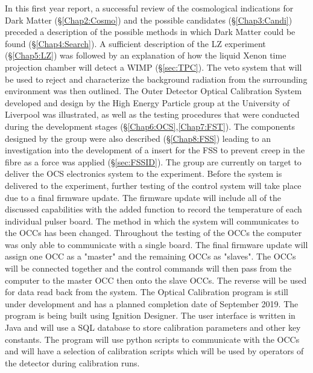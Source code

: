 In this first year report, a successful review of the cosmological indications for Dark Matter (\S\ref{Chap2:Cosmo}) and the possible candidates (\S\ref{Chap3:Candi}) preceded a description of the possible methods in which Dark Matter could be found (\S\ref{Chap4:Search}). A sufficient description of the LZ experiment (\S\ref{Chap5:LZ}) was followed by an explanation of how the liquid Xenon time projection chamber will detect a WIMP (\S\ref{sec:TPC}). The veto system that will be used to reject and characterize the background radiation from the surrounding environment was then outlined. 
\newline
The Outer Detector Optical Calibration System developed and design by the High Energy Particle group at the University of Liverpool was illustrated, as well as the testing procedures that were conducted during the development stages (\S\ref{Chap6:OCS},\ref{Chap7:FST}). The components designed by the group were also described (\S\ref{Chap8:FSS}) leading to an investigation into the development of a insert for the FSS to prevent creep in the fibre as a force was applied (\S\ref{sec:FSSID}).  
\newline
The group are currently on target to deliver the OCS electronics system to the experiment. Before the system is delivered to the experiment, further testing of the control system will take place due to a final firmware update. The firmware update will include all of the discussed capabilities with the added function to record the temperature of each individual pulser board. The method in which the system will communicates to the OCCs has been changed. Throughout the testing of the OCCs the computer was only able to communicate with a single board. The final firmware update will assign one OCC as a "master" and the remaining OCCs as "slaves". The OCCs will be connected together and the control commands will then pass from the computer to the master OCC then onto the slave OCCs. The reverse will be used for data read back from the system.
The Optical Calibration program is still under development and has a planned completion date of September 2019. The program is being built using Ignition Designer. The user interface is written in Java and will use a SQL database to store calibration parameters and other key constants. The program will use python scripts to communicate with the OCCs and will have a selection of calibration scripts which will be used by operators of the detector during calibration runs. 


